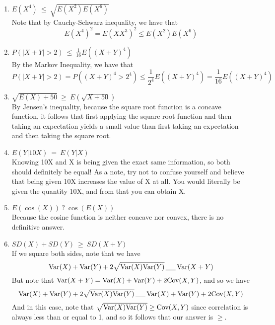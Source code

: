 \documentclass[11.5pt]{article}
\begin{document}
\begin{solution}{0.2}
\vspace{-1.5em}
\begin{enumerate}
	\item $E(X^4) \ \boxed{\leq} \ \sqrt{E(X^2)E(X^6)}$ \\
	Note that by Cauchy-Schwarz inequality, we have that
	$$E(X^4)^2 = E(XX^3)^2 \leq E(X^2)E(X^6)$$
	\item $P(|X+Y| > 2)  \ \boxed{\leq} \ \frac{1}{16}E((X+Y)^4)$ \\
	By the Markov Inequality, we have that
	$$P(|X + Y| > 2) = P((X + Y)^4 > 2^4) \leq \frac{1}{2^4} E((X + Y)^4) = \frac{1}{16} E((X + Y)^4)$$
	\item $\sqrt{E(X)+50}  \ \boxed{\geq} \  E(\sqrt{X+50})$ \\
	By Jensen's inequality, because the square root function is a concave function, it follows that first applying the square root function and then taking an expectation yields a small value than first taking an expectation and then taking the square root.
	\item $E(Y|10X)  \ \boxed{=} \  E(Y|X)$ \\
	Knowing 10X and X is being given the exact same information, so both should definitely be equal! As a note, try not to confuse yourself and believe that being given 10X increases the value of X at all. You would literally be given the quantity 10X, and from that you can obtain X.
	\item $E(\cos(X))  \ \boxed{?} \  \cos(E(X))$ \\
	Because the cosine function is neither concave nor convex, there is no definitive answer.
	\item $SD(X) + SD(Y) \ \boxed{\geq} \ SD(X+Y)$ \\
	If we square both sides, note that we have
	$$\textrm{Var}(X) + \textrm{Var}(Y) + 2 \sqrt{\textrm{Var}(X) \textrm{Var}(Y)} \,  \underline{\hspace{0.5cm}} \, \textrm{Var}(X + Y)$$
	But note that $\textrm{Var}(X + Y) = \textrm{Var}(X) + \textrm{Var}(Y) + 2 \textrm{Cov}(X, Y)$, and so we have
	$$\textrm{Var}(X) + \textrm{Var}(Y) + 2 \sqrt{\textrm{Var}(X) \textrm{Var}(Y)} \,  \underline{\hspace{0.5cm}} \, \textrm{Var}(X) + \textrm{Var}(Y) + 2 \textrm{Cov}(X, Y)$$
	And in this case, note that $\sqrt{\textrm{Var}(X) \textrm{Var}(Y)} \geq \textrm{Cov}(X, Y)$ since correlation is always less than or equal to 1, and so it follows that our answer is $\geq$.
\end{enumerate}
\end{solution}

\end{document}
